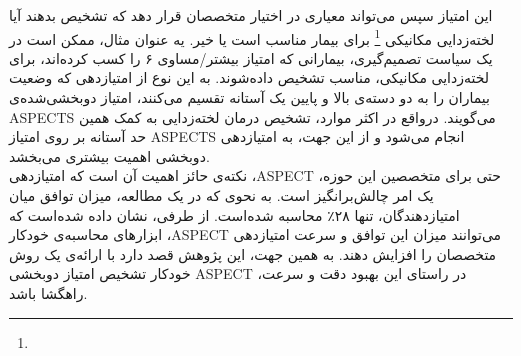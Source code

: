 این امتیاز سپس می‌تواند معیاری در اختیار متخصصان قرار دهد که تشخیص بدهند آیا لخته‌زدایی مکانیکی
\footnote{}
برای بیمار مناسب است یا خیر.
یه عنوان مثال، ممکن است در یک سیاست تصمیم‌گیری، بیمارانی که امتیاز بیشتر/مساوی ۶ را کسب کرده‌اند، برای لخته‌زدایی مکانیکی، مناسب تشخیص داده‌شوند.
به این نوع از امتیازدهی که وضعیت بیماران را به دو دسته‌ی بالا و پایین یک آستانه تقسیم می‌کنند، امتیاز دوبخشی‌شده‌ی ASPECTS می‌گویند.
درواقع در اکثر موارد، تشخیص درمان لخته‌زدایی به کمک همین حد آستانه بر روی امتیاز ASPECTS انجام می‌شود و از این جهت، به امتیاز‌دهی دوبخشی اهمیت بیشتری می‌بخشد.\\

نکته‌ی حائز اهمیت آن است که امتیازدهی ،ASPECT حتی برای متخصصین این حوزه، یک امر چالش‌بر‌انگیز است.
به نحوی که در یک مطالعه،
میزان توافق میان امتیازدهندگان، تنها ۲۸٪ محاسبه شده‌است.
از طرفی، نشان داده شده‌است که ابزار‌های محاسبه‌ی خودکار ،ASPECT می‌توانند
میزان این توافق و سرعت امتیازدهی متخصصان را افزایش دهند.
به همین جهت، این پژوهش قصد دارد با ارائه‌ی یک روش خودکار تشخیص امتیاز دوبخشی ASPECT 
در راستای این بهبود دقت و سرعت، راهگشا باشد.

